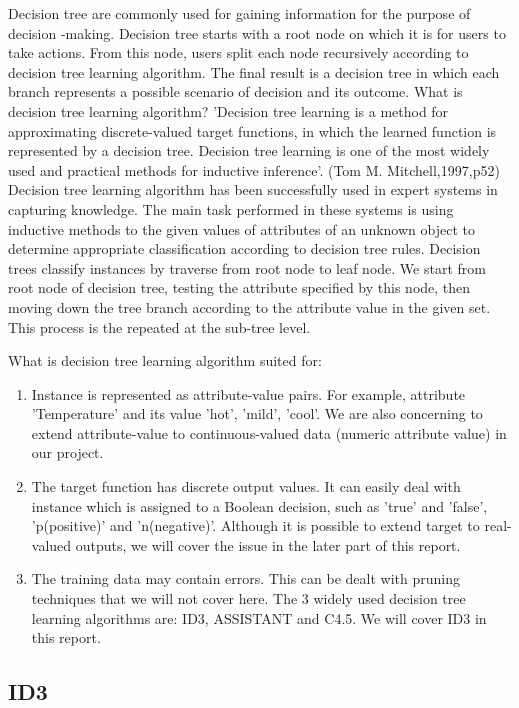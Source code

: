 \documentclass{article}
\begin{document}
Decision tree are commonly used for gaining information for the purpose of decision -making. Decision tree starts with a root node on which it is for users to take actions. From this node, users split each node recursively according to decision tree learning algorithm. The final result is a decision tree in which each branch represents a possible scenario of decision and its outcome.
What is decision tree learning algorithm?
	'Decision tree learning is a method for approximating discrete-valued target functions, in which the learned function is represented by a decision tree. Decision tree learning is one of the most widely used and practical methods for inductive inference'. (Tom M. Mitchell,1997,p52)
	Decision tree learning algorithm has been successfully used in expert systems in capturing knowledge. The main task performed in these systems is using inductive methods to the given values of attributes of an unknown object to determine appropriate classification according to decision tree rules.
	Decision trees classify instances by traverse from root node to leaf node. We start from root node of decision tree, testing the attribute specified by this node, then moving down the tree branch according to the attribute value in the given set. This process is the repeated at the sub-tree level.


What is decision tree learning algorithm suited for:
\begin{enumerate}
\item Instance is represented as attribute-value pairs. For example, attribute 'Temperature' and its value 'hot', 'mild', 'cool'. We are also concerning to extend attribute-value to continuous-valued data (numeric attribute value) in our project.
\item The target function has discrete output values. It can easily deal with instance which is assigned to a Boolean decision, such as 'true' and 'false', 'p(positive)' and 'n(negative)'. Although it is possible to extend target to real-valued outputs, we will cover the issue in the later part of this report.
\item The training data may contain errors. This can be dealt with pruning techniques that we will not cover here. The 3 widely used decision tree learning algorithms are: ID3, ASSISTANT and C4.5. We will cover ID3 in this report.
\end{enumerate}


\subsection{ID3}
\label{sec:ID3}
\end{document}
